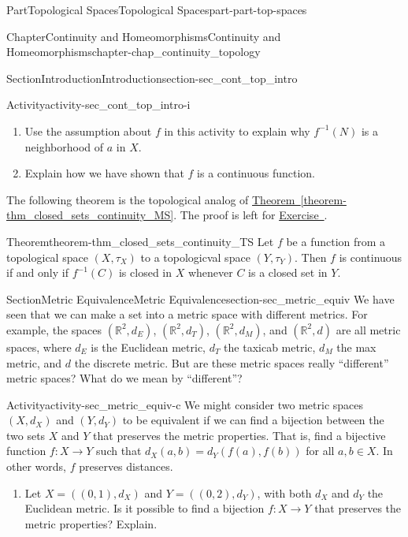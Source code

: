 \documentclass[oneside,10pt,]{book}
\newcommand{\xreffont}{\relax}
\numberwithin{equation}{chapter}
\newcommand{\R}{\mathbb{R}}
\begin{document}
\begin{partptx}{Part}{Topological Spaces}{}{Topological Spaces}{}{}{part-part-top-spaces}
\begin{chapterptx}{Chapter}{Continuity and Homeomorphisms}{}{Continuity and Homeomorphisms}{}{}{chapter-chap_continuity_topology}
\begin{sectionptx}{Section}{Introduction}{}{Introduction}{}{}{section-sec_cont_top_intro}
\begin{activity}{Activity}{}{activity-sec_cont_top_intro-i}
\begin{enumerate}[font=\bfseries,label=(\alph*),ref=\alph*]
\item{}Use the assumption about \(f\) in this activity to explain why \(f^{-1}(N)\) is a neighborhood of \(a\) in \(X\).%
\item{}Explain how we have shown that \(f\) is a continuous function.%
\end{enumerate}%
\end{activity}%
The following theorem is the topological analog of \hyperref[theorem-thm_closed_sets_continuity_MS]{Theorem~{\xreffont\ref{theorem-thm_closed_sets_continuity_MS}}}. The proof is left for \hyperlink{exercise-ex_closed_sets_continuity_TS}{Exercise~{\xreffont 4}}.%
\begin{theorem}{Theorem}{}{}{theorem-thm_closed_sets_continuity_TS}%
Let \(f\) be a function from a topological space \((X,\tau_X)\) to a topologicval space \((Y,\tau_Y)\). Then \(f\) is continuous if and only if \(f^{-1}(C)\) is closed in \(X\) whenever \(C\) is a closed set in \(Y\).%
\end{theorem}
\end{sectionptx}
%
%
\typeout{************************************************}
\typeout{************************************************}
%
\begin{sectionptx}{Section}{Metric Equivalence}{}{Metric Equivalence}{}{}{section-sec_metric_equiv}
We have seen that we can make a set into a metric space with different metrics. For example, the spaces \((\R^2, d_E)\), \((\R^2, d_T)\), \((\R^2, d_M)\), and \((\R^2, d)\) are all metric spaces, where \(d_E\) is the Euclidean metric, \(d_T\) the taxicab metric, \(d_M\) the max metric, and \(d\) the discrete metric. But are these metric spaces really ``different'' metric spaces? What do we mean by ``different''?%
\begin{activity}{Activity}{}{activity-sec_metric_equiv-c}%
We might consider two metric spaces \((X, d_X)\) and \((Y, d_Y)\) to be equivalent if we can find a bijection between the two sets \(X\) and \(Y\) that preserves the metric properties. That is, find a bijective function \(f : X \to Y\) such that \(d_X(a,b) = d_Y(f(a),
f(b))\) for all \(a,b \in X\). In other words, \(f\) preserves distances.%
\begin{enumerate}[font=\bfseries,label=(\alph*),ref=\alph*]%
\item{}Let \(X = ((0,1), d_X)\) and \(Y = ((0,2), d_Y)\), with both \(d_X\) and \(d_Y\) the Euclidean metric. Is it possible to find a bijection \(f : X \to Y\) that preserves the metric properties? Explain.%

\end{enumerate}
\end{activity}
\end{sectionptx}
\end{chapterptx}
\end{partptx}
\end{document}
